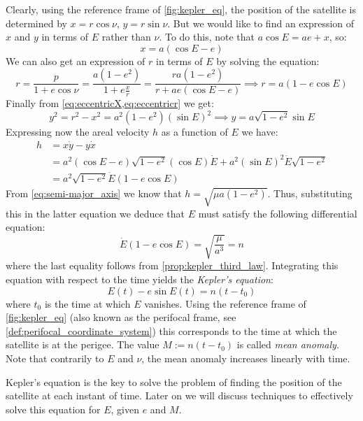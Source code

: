 \documentclass[../main.tex]{subfiles}
\begin{document}
Clearly, using the reference frame of \cref{fig:kepler_eq}, the position of the satellite is determined by $x=r\cos\nu$, $y=r\sin\nu$. But we would like to find an expression of $x$ and $y$ in terms of $E$ rather than $\nu$. To do this, note that $a\cos E=ae+x$, so:
\begin{equation}\label{eq:eccentricX}
  x=a(\cos E-e)
\end{equation}
We can also get an expression of $r$ in terms of $E$ by solving the equation:
\begin{equation}\label{eq:eccentricr}
  r=\frac{p}{1+e\cos \nu}=\frac{a(1-e^2)}{1+e\frac{x}{r}}=\frac{ra(1-e^2)}{r+ae(\cos E-e)}\implies r= a(1-e\cos E)
\end{equation}
Finally from \cref{eq:eccentricX,eq:eccentricr} we get:
\begin{equation}
  y^2=r^2-x^2=a^2(1-e^2){(\sin E)}^2\implies y=a\sqrt{1-e^2}\sin E
\end{equation}
Expressing now the areal velocity $h$ as a function of $E$ we have:
\begin{align}
  h & =x\dot{y}-y\dot{x}                                                           \\
    & =a^2(\cos E-e)\sqrt{1-e^2}(\cos E)\dot{E}+a^2{(\sin E)}^2\dot{E}\sqrt{1-e^2} \\
    & =a^2\sqrt{1-e^2}\dot{E}(1-e\cos E)
\end{align}
From \cref{eq:semi-major_axis} we know that $h=\sqrt{\mu a(1-e^2)}$. Thus, substituting this in the latter equation we deduce that $E$ must satisfy the following differential equation:
\begin{equation}\label{eq:kepler_equation_differential}
  \dot{E}(1-e\cos E)=\sqrt{\frac{\mu}{a^3}}=n
\end{equation}
where the last equality follows from \cref{prop:kepler_third_law}. Integrating this equation with respect to the time yields the \emph{Kepler's equation}:
\begin{equation}\label{eq:kepler_equation}
  E(t)-e\sin E(t)=n(t-t_0)
\end{equation}
where $t_0$ is the time at which $E$ vanishes. Using the reference frame of \cref{fig:kepler_eq} (also known as the perifocal frame, see \cref{def:perifocal_coordinate_system}) this corresponds to the time at which the satellite is at the perigee. The value $M:=n(t-t_0)$ is called \emph{mean anomaly}. Note that contrarily to $E$ and $\nu$, the mean anomaly increases linearly with time.

Kepler's equation is the key to solve the problem of finding the position of the satellite at each instant of time. Later on we will discuss techniques to effectively solve this equation for $E$, given $e$ and $M$.
\end{document}
